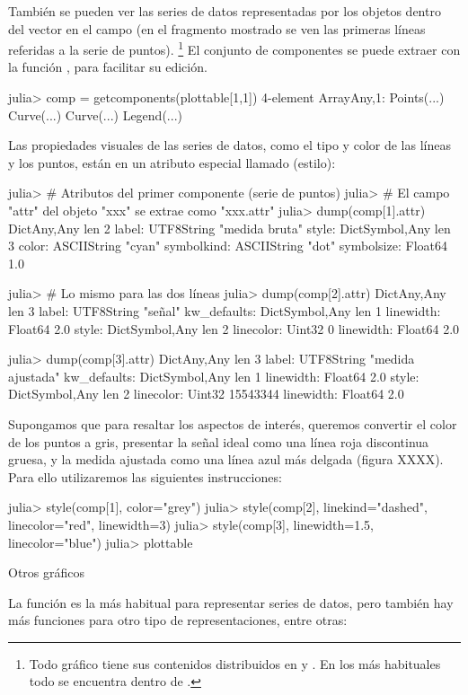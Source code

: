 ﻿\documentclass[spanish]{article}
\begin{document}
También se pueden ver las series de datos representadas por los objetos dentro del vector  en el campo  (en el fragmento mostrado se ven las primeras líneas referidas a la serie de puntos).%
\footnote{%
Todo gráfico tiene sus contenidos distribuidos en  y
. En los más habituales todo se encuentra dentro de
.%
} 
El conjunto de componentes se puede extraer con la función , para facilitar su edición.

julia> comp = getcomponents(plottable[1,1])
4-element Array{Any,1}:
 Points(...)
 Curve(...) 
 Curve(...) 
 Legend(...)

Las propiedades visuales de las series de datos, como el tipo y color de las líneas y los puntos, están en un atributo especial llamado  (estilo):

julia> # Atributos del primer componente (serie de puntos)
julia> # El campo "attr" del objeto "xxx" se extrae como "xxx.attr"
julia> dump(comp[1].attr)
Dict{Any,Any} len 2
  label: UTF8String "medida bruta"
  style: Dict{Symbol,Any} len 3
    color: ASCIIString "cyan"
    symbolkind: ASCIIString "dot"
    symbolsize: Float64 1.0

julia> # Lo mismo para las dos líneas
julia> dump(comp[2].attr)
Dict{Any,Any} len 3
  label: UTF8String "señal"
  kw_defaults: Dict{Symbol,Any} len 1
    linewidth: Float64 2.0
  style: Dict{Symbol,Any} len 2
    linecolor: Uint32 0
    linewidth: Float64 2.0

julia> dump(comp[3].attr)
Dict{Any,Any} len 3
  label: UTF8String "medida ajustada"
  kw_defaults: Dict{Symbol,Any} len 1
    linewidth: Float64 2.0
  style: Dict{Symbol,Any} len 2
    linecolor: Uint32 15543344
    linewidth: Float64 2.0

Supongamos que para resaltar los aspectos de interés, queremos convertir el color de los puntos a gris, presentar la señal ideal como una línea roja discontinua gruesa, y la medida ajustada como una línea azul más delgada (figura XXXX). Para ello utilizaremos las siguientes instrucciones:

julia> style(comp[1], color="grey")
julia> style(comp[2], linekind="dashed", linecolor="red", linewidth=3)
julia> style(comp[3], linewidth=1.5, linecolor="blue")
julia> plottable

Otros gráficos

La función  es la más habitual para representar series de datos, pero también hay más funciones para otro tipo de representaciones, entre otras:
\end{document}
